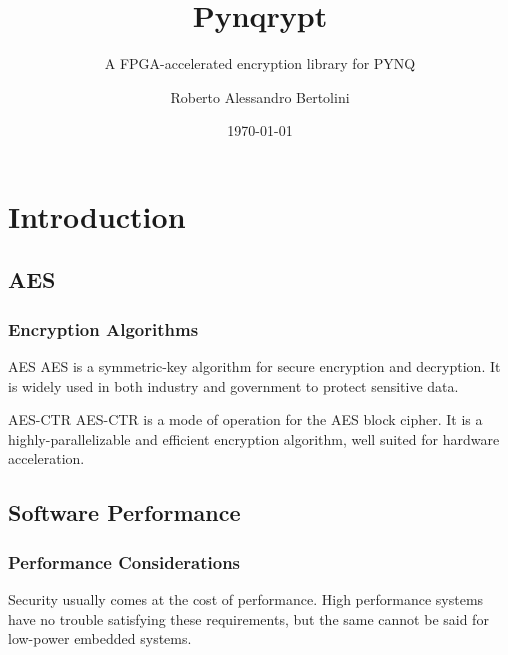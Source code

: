 \documentclass{beamer}
\title{Pynqrypt}
\author{Roberto Alessandro Bertolini}
\institute{FPGA101 - Politecnico di Milano}
\date{\today}
\subtitle{A FPGA-accelerated encryption library for PYNQ}
\begin{document}
\begin{frame}
    \titlepage
\end{frame}

\section{Introduction}

\subsection{AES}
\begin{frame}
    \frametitle{Encryption Algorithms}

    \begin{block}{AES}
    AES is a symmetric-key algorithm for secure encryption and decryption. It is widely used in both industry and government to protect sensitive data.
    \end{block}

    \begin{block}{AES-CTR}
    AES-CTR is a mode of operation for the AES block cipher. It is a highly-parallelizable and efficient encryption algorithm, well suited for hardware acceleration.
    \end{block}
\end{frame}

\subsection{Software Performance}
\begin{frame}
    \frametitle{Performance Considerations}

    Security usually comes at the cost of performance.
    High performance systems have no trouble satisfying these requirements, but the same cannot be said for low-power embedded systems.

    \begin{adjustbox}{max height=2in, center}
    \end{adjustbox}
\end{frame}
\end{document}
